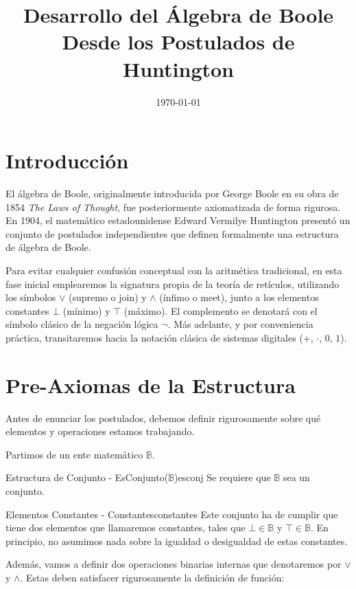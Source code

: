 \documentclass[12pt,a4paper]{article}
\title{Desarrollo del Álgebra de Boole \\ \large Desde los Postulados de Huntington}
\author{}
\date{\today}
\begin{document}
\maketitle

\section{Introducción}
El álgebra de Boole, originalmente introducida por George Boole en su obra de 1854 \textit{The Laws of Thought}, fue posteriormente axiomatizada de forma rigurosa. En 1904, el matemático estadounidense Edward Vermilye Huntington presentó un conjunto de postulados independientes que definen formalmente una estructura de álgebra de Boole. 

Para evitar cualquier confusión conceptual con la aritmética tradicional, en esta fase inicial emplearemos la signatura propia de la teoría de retículos, utilizando los símbolos $\vee$ (supremo o join) y $\wedge$ (ínfimo o meet), junto a los elementos constantes $\bot$ (mínimo) y $\top$ (máximo). El complemento se denotará con el símbolo clásico de la negación lógica $\neg$. Más adelante, y por conveniencia práctica, transitaremos hacia la notación clásica de sistemas digitales ($+$, $\cdot$, $0$, $1$).

\section{Pre-Axiomas de la Estructura}
Antes de enunciar los postulados, debemos definir rigurosamente sobre qué elementos y operaciones estamos trabajando. 

Partimos de un ente matemático $\mathbb{B}$.

\begin{preaxioma}{Estructura de Conjunto - EsConjunto($\mathbb{B}$)}{esconj}
Se requiere que $\mathbb{B}$ sea un conjunto.
\end{preaxioma}

\begin{preaxioma}{Elementos Constantes - Constantes}{constantes}
Este conjunto ha de cumplir que tiene dos elementos que llamaremos constantes, tales que $\bot \in \mathbb{B}$ y $\top \in \mathbb{B}$. En principio, no asumimos nada sobre la igualdad o desigualdad de estas constantes.
\end{preaxioma}

Además, vamos a definir dos operaciones binarias internas que denotaremos por $\vee$ y $\wedge$. Estas deben satisfacer rigurosamente la definición de función:
\end{document}
